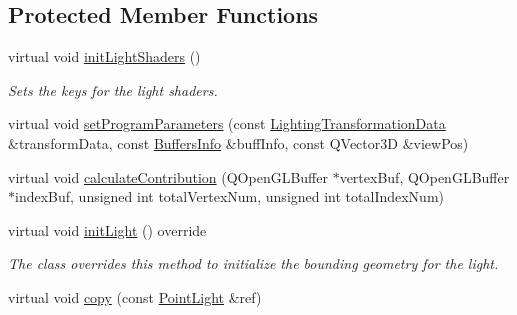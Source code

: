 \subsection*{Protected Member Functions}
\begin{DoxyCompactItemize}
\item 
\mbox{\label{class_geometry_engine_1_1_geometry_world_item_1_1_geometry_light_1_1_point_light_a753a40c1c3c3a9a550980c002c636cfa}} 
virtual void \mbox{\hyperlink{class_geometry_engine_1_1_geometry_world_item_1_1_geometry_light_1_1_point_light_a753a40c1c3c3a9a550980c002c636cfa}{init\+Light\+Shaders}} ()
\begin{DoxyCompactList}\small\item\em Sets the keys for the light shaders. \end{DoxyCompactList}\item 
virtual void \mbox{\hyperlink{class_geometry_engine_1_1_geometry_world_item_1_1_geometry_light_1_1_point_light_a287719ee9b9e395314212862105a83b4}{set\+Program\+Parameters}} (const \mbox{\hyperlink{class_geometry_engine_1_1_lighting_transformation_data}{Lighting\+Transformation\+Data}} \&transform\+Data, const \mbox{\hyperlink{class_geometry_engine_1_1_buffers_info}{Buffers\+Info}} \&buff\+Info, const Q\+Vector3D \&view\+Pos)
\item 
virtual void \mbox{\hyperlink{class_geometry_engine_1_1_geometry_world_item_1_1_geometry_light_1_1_point_light_aa30244fd20e61fdfe1ac1d85c99fd154}{calculate\+Contribution}} (Q\+Open\+G\+L\+Buffer $\ast$vertex\+Buf, Q\+Open\+G\+L\+Buffer $\ast$index\+Buf, unsigned int total\+Vertex\+Num, unsigned int total\+Index\+Num)
\item 
\mbox{\label{class_geometry_engine_1_1_geometry_world_item_1_1_geometry_light_1_1_point_light_a0c6434862dabcbe1e32e04b8d73b5314}} 
virtual void \mbox{\hyperlink{class_geometry_engine_1_1_geometry_world_item_1_1_geometry_light_1_1_point_light_a0c6434862dabcbe1e32e04b8d73b5314}{init\+Light}} () override
\begin{DoxyCompactList}\small\item\em The class overrides this method to initialize the bounding geometry for the light. \end{DoxyCompactList}\item 
virtual void \mbox{\hyperlink{class_geometry_engine_1_1_geometry_world_item_1_1_geometry_light_1_1_point_light_ab0ed78036120211285fffdde1408352e}{copy}} (const \mbox{\hyperlink{class_geometry_engine_1_1_geometry_world_item_1_1_geometry_light_1_1_point_light}{Point\+Light}} \&ref)
\end{DoxyCompactItemize}
